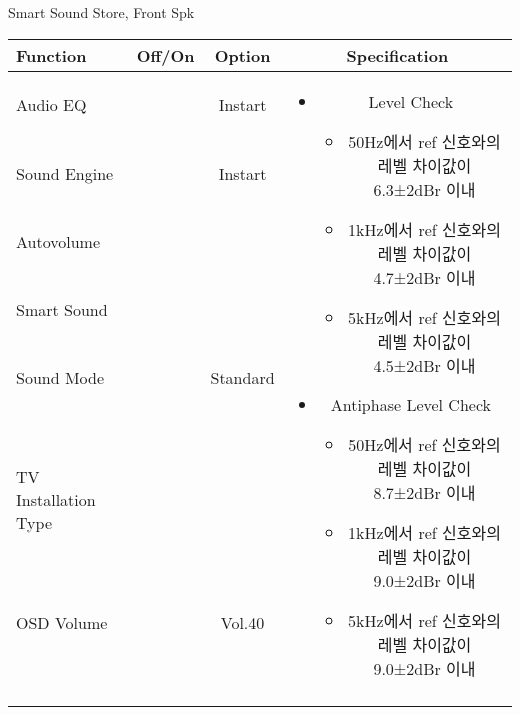 \begin{frame}[t]{Smart Sound Store, Front Spk}
\begin{tiny}
\begin{tabular}{@{}lccc@{}}
\toprule
Function & Off/On & Option & Specification \\
\midrule
Audio EQ & \color{black}{Off} & Instart &
\multirow{10}{60mm}{
\begin{itemize}
	\item Level Check
	\begin{itemize}
		\item 50Hz에서 ref 신호와의 레벨 차이값이 6.3±2dBr 이내
		\item 1kHz에서 ref 신호와의 레벨 차이값이 4.7±2dBr 이내
		\item 5kHz에서 ref 신호와의 레벨 차이값이 4.5±2dBr 이내
	\end{itemize}
	\item Antiphase Level Check
	\begin{itemize}
		\item 50Hz에서 ref 신호와의 레벨 차이값이 8.7±2dBr 이내
		\item 1kHz에서 ref 신호와의 레벨 차이값이 9.0±2dBr 이내
		\item 5kHz에서 ref 신호와의 레벨 차이값이 9.0±2dBr 이내
	\end{itemize}
\end{itemize}
} \\
Sound Engine & \color{blue}{On} & Instart & \\
Autovolume & \color{black}{Off} & & \\
Smart Sound & \color{blue}{On} & & \\
Sound Mode & \color{blue}{On} & Standard & \\
TV Installation Type & \color{blue}{On} & \color{black}{Standtype1} & \\
OSD Volume & \color{blue}{On} & Vol.40 & \\
& & & \\
& & & \\
& & & \\
& & & \\
\midrule
\end{tabular}
\end{tiny}

\end{frame}


